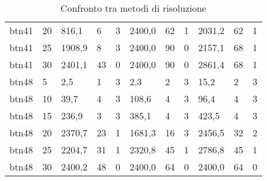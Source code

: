 \begin{table}[]
\begin{tabular}{@{}lllllllllll@{}}
		btn41   & 20            & 816,1     & 6         & 3      & 2400,0    & 62        & 1      & 2031,2    & 62        & 1      \\
		btn41   & 25            & 1908,9    & 8         & 3      & 2400,0    & 90        & 0      & 2157,1    & 68        & 1      \\
		btn41   & 30            & 2401,1    & 43        & 0      & 2400,0    & 90        & 0      & 2861,4    & 68        & 1      \\
		btn48   & 5             & 2,5       & 1         & 3      & 2,3       & 2         & 3      & 15,2      & 2         & 3      \\
		btn48   & 10            & 39,7      & 4         & 3      & 108,6     & 4         & 3      & 96,4      & 4         & 3      \\
		btn48   & 15            & 236,9     & 3         & 3      & 385,1     & 4         & 3      & 423,5     & 4         & 3      \\
		btn48   & 20            & 2370,7    & 23        & 1      & 1681,3    & 16        & 3      & 2456,5    & 32        & 2      \\
		btn48   & 25            & 2204,7    & 31        & 1      & 2320,8    & 45        & 1      & 2786,8    & 45        & 1      \\
		btn48   & 30            & 2400,2    & 48        & 0      & 2400,0    & 64        & 0      & 2400,0    & 64        & 0      \\ \bottomrule
	\end{tabular}
	\caption{Confronto tra metodi di risoluzione}
	\label{tab:confronto}
\end{table}
%
%
